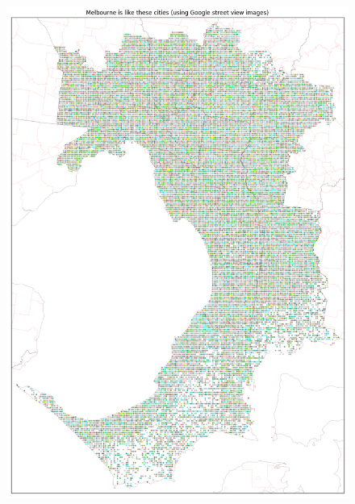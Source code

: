 \documentclass[sageh,times]{sagej}
\begin{document}
\begin{figure}[!htbp]
\centering    
\includegraphics[scale=0.20]{Images/MelbourneOverall_street.png} 

\end{figure}
\end{document}

